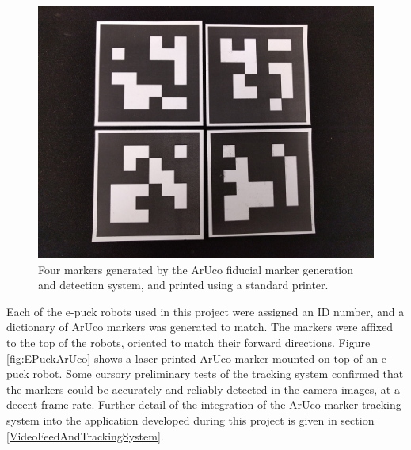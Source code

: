 \begin{figure}
	\centering
	\includegraphics[scale=0.3]{Figures/ARuCoTags.png}
	\decoRule
	\caption[ArUco Markers]{Four markers generated by the ArUco fiducial marker generation and detection system, and printed using a standard printer.}
	\label{fig:ArUcoTags}
\end{figure}

Each of the e-puck robots used in this project were assigned an ID number, and a dictionary of ArUco markers was generated to match. The markers were affixed to the top of the robots, oriented to match their forward directions. Figure \ref{fig:EPuckArUco} shows a laser printed ArUco marker mounted on top of an e-puck robot. Some cursory preliminary tests of the tracking system confirmed that the markers could be accurately and reliably detected in the camera images, at a decent frame rate. Further detail of the integration of the ArUco marker tracking system into the application developed during this project is given in section \ref{VideoFeedAndTrackingSystem}.

